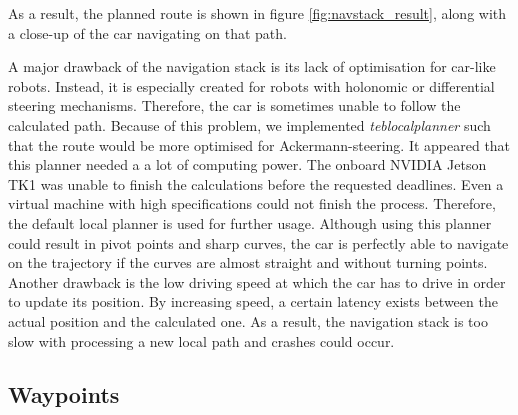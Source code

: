 \documentclass[conference,a4paper]{IEEEtran}
\begin{document}
As a result, the planned route is shown in figure \ref{fig:navstack_result}, along with a close-up of the car navigating on that path. 

A major drawback of the navigation stack is its lack of optimisation for car-like robots. Instead, it is especially created for robots with holonomic or differential steering mechanisms. Therefore, the car is sometimes unable to follow the calculated path. Because of this problem, we implemented \emph{teb\textunderscore local\textunderscore planner} such that the route would be more optimised for Ackermann-steering. It appeared that this planner needed a a lot of computing power. The onboard NVIDIA Jetson TK1 was unable to finish the calculations before the requested deadlines. Even a virtual machine with high specifications could not finish the process. Therefore, the default local planner is used for further usage. Although using this planner could result in pivot points and sharp curves, the car is perfectly able to navigate on the trajectory if the curves are almost straight and without turning points.
Another drawback is the low driving speed at which the car has to drive in order to update its position. By increasing speed, a certain latency exists between the actual position and the calculated one. As a result, the navigation stack is too slow with processing a new local path and crashes could occur.

\subsection{Waypoints}
%
%
%
\end{document}
